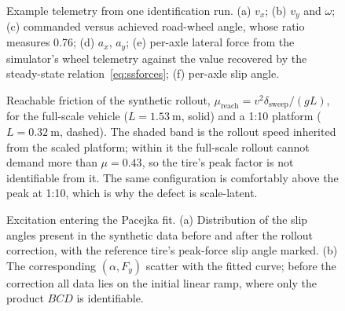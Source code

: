 %
%




\begin{figure}[t]
\centering
{}
\caption{Example telemetry from one identification run. (a) $v_{x}$;
(b) $v_{y}$ and $\omega$; (c) commanded versus achieved road-wheel angle,
whose ratio measures \num{0.76}; (d) $a_{x}$, $a_{y}$; (e) per-axle lateral
force from the simulator's wheel telemetry against the value recovered by the
steady-state relation~\eqref{eq:ssforces}; (f) per-axle slip angle.}
\label{fig:telemetry}
\end{figure}

\begin{figure}[t]
\centering
{}
\caption{Reachable friction of the synthetic rollout,
$\mu_{\mathrm{reach}}=v^{2}\delta_{\mathrm{sweep}}/(gL)$, for the full-scale
vehicle ($L=\SI{1.53}{\meter}$, solid) and a 1:10 platform
($L=\SI{0.32}{\meter}$, dashed). The shaded band is the rollout speed
inherited from the scaled platform; within it the full-scale rollout cannot
demand more than $\mu=0.43$, so the tire's peak factor is not identifiable
from it. The same configuration is comfortably above the peak at 1:10, which
is why the defect is scale-latent.}
\label{fig:mureach}
\end{figure}

\begin{figure}[t]
\centering
{}
\caption{Excitation entering the Pacejka fit. (a) Distribution of the slip
angles present in the synthetic data before and after the rollout correction,
with the reference tire's peak-force slip angle marked. (b) The corresponding
$(\alpha,F_{y})$ scatter with the fitted curve; before the correction all data
lies on the initial linear ramp, where only the product $BCD$ is
identifiable.}
\label{fig:excitation}
\end{figure}

